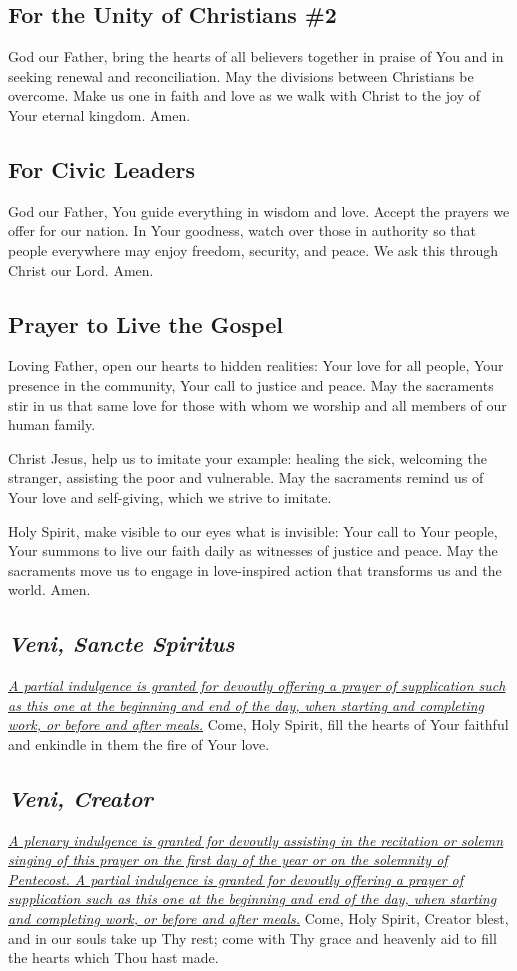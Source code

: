 \documentclass[12pt]{article}
\newcommand{\prayertitle}[1]{\subsection{#1}}
\newcommand{\indulgencedprayertitle}[1]{\prayertitle{#1 \protect\kreuz}}
\newcommand{\foreign}[1]{\textsl{#1}}
\newcommand{\note}[1]{{\small{\textsl{#1}}}\newline}
\newcommand{\linkednote}[2]{\hyperlink{#1}{\note{#2}}}
\begin{document}
\prayertitle{For the Unity of Christians \#2}
God our Father, bring the hearts of all believers together in praise of You and in seeking renewal and reconciliation.
May the divisions between Christians be overcome.
Make us one in faith and love as we walk with Christ to the joy of Your eternal kingdom.
Amen.

\prayertitle{For Civic Leaders}
God our Father, You guide everything in wisdom and love.
Accept the prayers we offer for our nation.
In Your goodness, watch over those in authority so that people everywhere may enjoy freedom, security, and peace.
We ask this through Christ our Lord.
Amen.
\newpage
\prayertitle{Prayer to Live the Gospel}
Loving Father, open our hearts to hidden realities:
Your love for all people,
Your presence in the community,
Your call to justice and peace.
May the sacraments stir in us
that same love for those with whom we worship and all members of our human family.

Christ Jesus, help us to imitate your example:
healing the sick,
welcoming the stranger,
assisting the poor and vulnerable.
May the sacraments remind us
of Your love and self-giving,
which we strive to imitate.

Holy Spirit, make visible to our eyes what is invisible:
Your call to Your people,
Your summons to live our faith daily
as witnesses of justice and peace.
May the sacraments move us to engage in love-inspired action that transforms us and the world.
Amen.

\indulgencedprayertitle{\foreign{Veni, Sancte Spiritus}}
\linkednote{grant26}{A partial indulgence is granted for devoutly offering a prayer of supplication such as this one at the beginning and end of the day, when starting and completing work, or before and after meals.}
Come, Holy Spirit, fill the hearts of Your faithful and enkindle in them the fire of Your love.

\indulgencedprayertitle{\foreign{Veni, Creator}}
\linkednote{grant26}{A plenary indulgence is granted for devoutly assisting in the recitation or solemn singing of this prayer on the first day of the year or on the solemnity of Pentecost.
A partial indulgence is granted for devoutly offering a prayer of supplication such as this one at the beginning and end of the day, when starting and completing work, or before and after meals.}
Come, Holy Spirit, Creator blest,
and in our souls take up Thy rest;
come with Thy grace and heavenly aid
to fill the hearts which Thou hast made.
\end{document}
